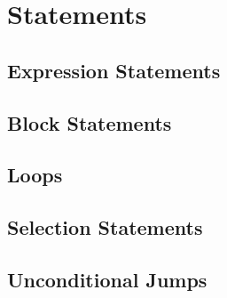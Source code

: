 \section{Statements}

\subsection{Expression Statements}
\subsection{Block Statements}
\subsection{Loops}
\subsection{Selection Statements}
\subsection{Unconditional Jumps}